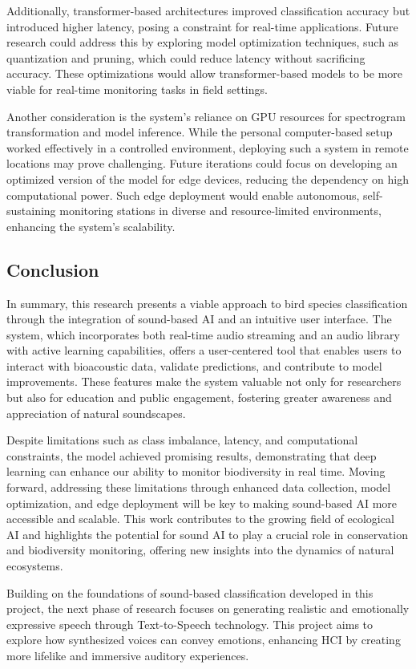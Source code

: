 Additionally, transformer-based architectures improved classification accuracy but introduced higher latency, posing a constraint for real-time applications. Future research could address this by exploring model optimization techniques, such as quantization and pruning, which could reduce latency without sacrificing accuracy. These optimizations would allow transformer-based models to be more viable for real-time monitoring tasks in field settings.

Another consideration is the system's reliance on GPU resources for spectrogram transformation and model inference. While the personal computer-based setup worked effectively in a controlled environment, deploying such a system in remote locations may prove challenging. Future iterations could focus on developing an optimized version of the model for edge devices, reducing the dependency on high computational power. Such edge deployment would enable autonomous, self-sustaining monitoring stations in diverse and resource-limited environments, enhancing the system’s scalability.

\subsection{Conclusion}
In summary, this research presents a viable approach to bird species classification through the integration of sound-based AI and an intuitive user interface. The system, which incorporates both real-time audio streaming and an audio library with active learning capabilities, offers a user-centered tool that enables users to interact with bioacoustic data, validate predictions, and contribute to model improvements. These features make the system valuable not only for researchers but also for education and public engagement, fostering greater awareness and appreciation of natural soundscapes.

Despite limitations such as class imbalance, latency, and computational constraints, the model achieved promising results, demonstrating that deep learning can enhance our ability to monitor biodiversity in real time. Moving forward, addressing these limitations through enhanced data collection, model optimization, and edge deployment will be key to making sound-based AI more accessible and scalable. This work contributes to the growing field of ecological AI and highlights the potential for sound AI to play a crucial role in conservation and biodiversity monitoring, offering new insights into the dynamics of natural ecosystems.

Building on the foundations of sound-based classification developed in this project, the next phase of research focuses on generating realistic and emotionally expressive speech through Text-to-Speech technology. This project aims to explore how synthesized voices can convey emotions, enhancing HCI by creating more lifelike and immersive auditory experiences.

